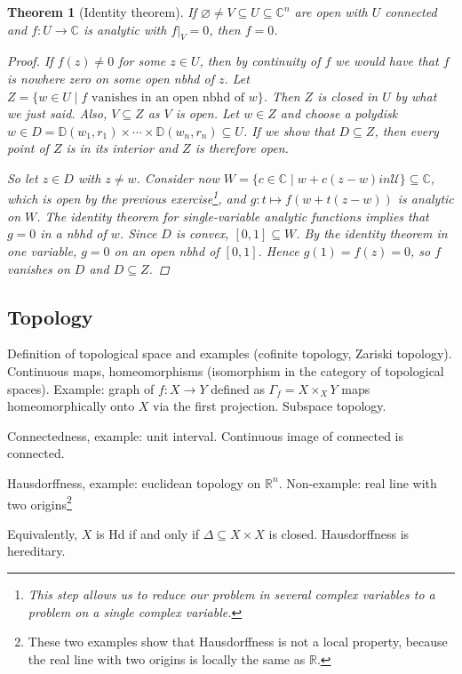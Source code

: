 \documentclass[12pt]{article}
\theoremstyle{darkgreentheorem}
\newtheorem{thm}{Theorem}[section]
\theoremstyle{darkbluedefinition}
\theoremstyle{darkredexample}
\theoremstyle{remark}
\newcommand{\R}{\mathbb{R}}
\newcommand{\1}{\mathbbm{1}}
\newcommand{\C}{\mathbb{C}}
\newcommand{\bbD}{\mathbb{D}}
\newcommand{\U}{\mathcal{U}}
\newcommand{\fp}[1]{\times_{#1}}
\begin{document}
\begin{thm}[Identity theorem]
    If $\varnothing \neq V\subseteq U\subseteq \C^{n}$ are open with $U$ connected and $f\colon U\to \C$ is analytic with $f|_{V}=0$, then $f=0$.
    \begin{proof}
	If $f(z)\neq 0$ for some $z\in U$, then by continuity of $f$ we would have that $f$ is nowhere zero on some open nbhd of $z$.
	Let $Z=\{w\in U\mid f \text{ vanishes in an open nbhd of }w\}$.
	Then $Z$ is closed in $U$ by what we just said.
	Also, $V\subseteq Z$ as $V$ is open.
	Let $w\in Z$ and choose a polydisk $w\in D=\bbD(w_{1},r_{1})\times \cdots \times \bbD(w_{n},r_{n})\subseteq U$.
	If we show that $D\subseteq Z$, then every point of $Z$ is in its interior and $Z$ is therefore open.
	
	So let $z\in D$ with $z\neq w$.
	Consider now $W=\{c\in \C\mid w+c(z-w)in \U\}\subseteq \C$, which is open by the previous exercise\footnote{This step allows us to reduce our problem in several complex variables to a problem on a single complex variable.}, and $g\colon t\mapsto f(w+t(z-w))$ is analytic on $W$.
	The identity theorem for single-variable analytic functions implies that $g=0$ in a nbhd of $w$.
	Since $D$ is convex, $[0,1]\subseteq W$.
	By the identity theorem in one variable, $g=0$ on an open nbhd of $[0,1]$.
	Hence $g(1)=f(z)=0$, so $f$ vanishes on $D$ and $D\subseteq Z$.
    \end{proof}
\end{thm}

\subsection{Topology}

Definition of topological space and examples (cofinite topology, Zariski topology).
Continuous maps, homeomorphisms (isomorphism in the category of topological spaces).
Example: graph of $f\colon X\to Y$ defined as $\Gamma_{f}=X\fp{X}Y$ maps homeomorphically onto $X$ via the first projection.
Subspace topology.

Connectedness, example: unit interval.
Continuous image of connected is connected.

Hausdorffness, example: euclidean topology on $\R^{n}$.
Non-example: real line with two origins\footnote{These two examples show that Hausdorffness is not a local property, because the real line with two origins is locally the same as $\R$.}

Equivalently, $X$ is Hd if and only if $\Delta\subseteq X\times X$ is closed.
Hausdorffness is hereditary.
\end{document}
